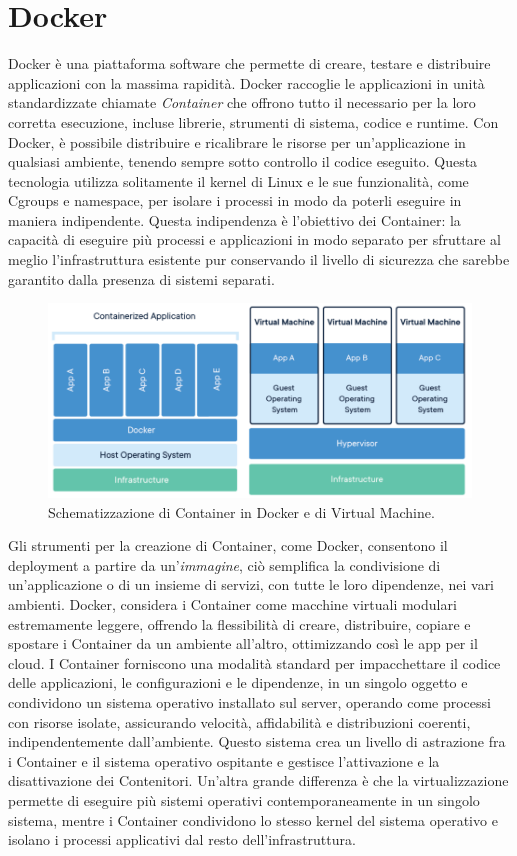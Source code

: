 \section{Docker}
Docker è una piattaforma software che permette di creare, testare e distribuire applicazioni con la massima rapidità. Docker raccoglie 
le applicazioni in unità standardizzate chiamate \textit{Container} che offrono tutto il necessario per la loro corretta esecuzione, incluse librerie, 
strumenti di sistema, codice e runtime. Con Docker, è possibile distribuire e ricalibrare le risorse per un'applicazione in qualsiasi ambiente, 
tenendo sempre sotto controllo il codice eseguito.\hfill\break
Questa tecnologia utilizza solitamente il kernel di Linux e le sue funzionalità, come Cgroups e namespace, per isolare i processi in modo da poterli 
eseguire in maniera indipendente. Questa indipendenza è l'obiettivo dei Container: la capacità di eseguire più processi e applicazioni in 
modo separato per sfruttare al meglio l'infrastruttura esistente pur conservando il livello di sicurezza che sarebbe garantito dalla 
presenza di sistemi separati.
%
\begin{figure}[ht!]
    \centering
    \includegraphics[scale=0.5]{images/Docker_Config_Container.png}
    \caption{Schematizzazione di Container in Docker e di Virtual Machine.}
    \label{fig:DCC}
\end{figure}
\hfill\break
Gli strumenti per la creazione di Container, come Docker, consentono il deployment a partire da un'\textit{immagine}, ciò semplifica la condivisione di 
un'applicazione o di un insieme di servizi, con tutte le loro dipendenze, nei vari ambienti.
Docker, considera i Container come macchine virtuali modulari estremamente leggere, offrendo la flessibilità di creare, distribuire, 
copiare e spostare i Container da un ambiente all'altro, ottimizzando così le app per il cloud.\hfill\break
I Container forniscono una modalità standard per impacchettare il codice delle applicazioni, le configurazioni e le dipendenze, in un singolo oggetto e 
condividono un sistema operativo installato sul server, operando come processi con risorse isolate, assicurando velocità, affidabilità e distribuzioni coerenti, 
indipendentemente dall’ambiente.\hfill\break
%
Questo sistema crea un livello di astrazione fra i Container e il sistema operativo ospitante e gestisce l’attivazione e la disattivazione dei Contenitori. 
Un'altra grande differenza è che la virtualizzazione permette di eseguire più sistemi operativi contemporaneamente in un singolo sistema, mentre i Container 
condividono lo stesso kernel del sistema operativo e isolano i processi applicativi dal resto dell’infrastruttura.
%
